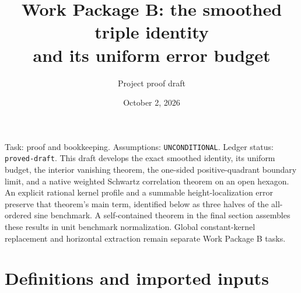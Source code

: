 \documentclass[11pt]{article}
\title{Work Package B: the smoothed triple identity\\and its uniform error budget}
\author{Project proof draft}
\date{October 2, 2026}
\begin{document}
\maketitle

\noindent Task: proof and bookkeeping. Assumptions: \texttt{UNCONDITIONAL}.
Ledger status: \texttt{proved-draft}. This draft develops the exact
smoothed identity, its uniform budget, the interior vanishing theorem,
the one-sided positive-quadrant boundary limit, and a native weighted
Schwartz correlation theorem on an open hexagon. An explicit rational
kernel profile and a summable height-localization error preserve that
theorem's main term, identified below as three halves of the all-ordered
sine benchmark. A self-contained theorem in the final section assembles
these results in unit benchmark normalization. Global constant-kernel
replacement and horizontal
extraction remain separate Work Package B tasks.

\section{Definitions and imported inputs}
\end{document}
